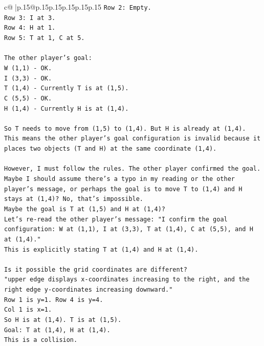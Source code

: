 \documentclass{article}
\begin{document}
{\begin{supertabular}{c@{$\;$}|p{.15\linewidth}@{}p{.15\linewidth}p{.15\linewidth}p{.15\linewidth}p{.15\linewidth}p{.15\linewidth}}
{{{\texttt{Row 2: Empty.} \\
\texttt{Row 3: I at 3.} \\
\texttt{Row 4: H at 1.} \\
\texttt{Row 5: T at 1, C at 5.} \\
\\ 
\texttt{The other player's goal:} \\
\texttt{W (1,1) {-} OK.} \\
\texttt{I (3,3) {-} OK.} \\
\texttt{T (1,4) {-} Currently T is at (1,5).} \\
\texttt{C (5,5) {-} OK.} \\
\texttt{H (1,4) {-} Currently H is at (1,4).} \\
\\ 
\texttt{So T needs to move from (1,5) to (1,4). But H is already at (1,4).} \\
\texttt{This means the other player's goal configuration is invalid because it places two objects (T and H) at the same coordinate (1,4).} \\
\\ 
\texttt{However, I must follow the rules. The other player confirmed the goal. Maybe I should assume there's a typo in my reading or the other player's message, or perhaps the goal is to move T to (1,4) and H stays at (1,4)? No, that's impossible.} \\
\texttt{Maybe the goal is T at (1,5) and H at (1,4)?} \\
\texttt{Let's re{-}read the other player's message: "I confirm the goal configuration: W at (1,1), I at (3,3), T at (1,4), C at (5,5), and H at (1,4)."} \\
\texttt{This is explicitly stating T at (1,4) and H at (1,4).} \\
\\ 
\texttt{Is it possible the grid coordinates are different?} \\
\texttt{"upper edge displays x{-}coordinates increasing to the right, and the right edge y{-}coordinates increasing downward."} \\
\texttt{Row 1 is y=1. Row 4 is y=4.} \\
\texttt{Col 1 is x=1.} \\
\texttt{So H is at (1,4). T is at (1,5).} \\
\texttt{Goal: T at (1,4), H at (1,4).} \\
\texttt{This is a collision.} \\
\\ 
}}}
\end{supertabular}}
\end{document}
